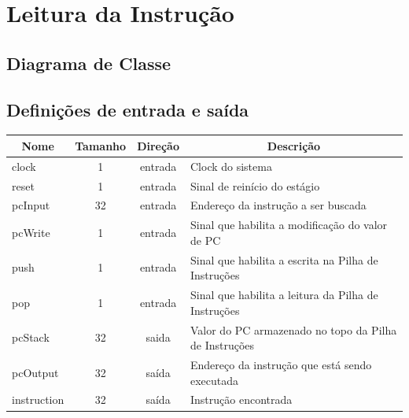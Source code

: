 \section{Leitura da Instrução}
	\subsection{Diagrama de Classe}
  \begin{figure}[h!]
    
  \end{figure}
		
		\subsection{Definições de entrada e saída}
		
	\begin{center}
		\begin{longtable}[pos]{| l | c | c | m{7cm} |} \hline
			\multicolumn{1}{|c|}{\cellcolor[gray]{0.9}\textbf{Nome}} & 
			\multicolumn{1}{c|}{\cellcolor[gray]{0.9}\textbf{Tamanho}} & 
			\multicolumn{1}{c|}{\cellcolor[gray]{0.9}\textbf{Direção}} &
			\multicolumn{1}{c|}{\cellcolor[gray]{0.9}\textbf{Descrição}} \\ \hline
			\endhead
			\hline
			\endlastfoot
			clock & 1 & entrada & Clock do sistema \\ \hline
			reset & 1 & entrada & Sinal de reinício do estágio\\ \hline
			pcInput & 32 & entrada & Endereço da instrução a ser buscada \\ \hline
			pcWrite & 1 & entrada & Sinal que habilita a modificação do valor de PC \\ \hline
			push & 1 & entrada & Sinal que habilita a escrita na Pilha de Instruções\\ \hline
			pop & 1 & entrada & Sinal que habilita a leitura da Pilha de Instruções\\ \hline
			pcStack & 32 & saida & Valor do PC armazenado no topo da Pilha de Instruções\\ \hline
			pcOutput & 32 & saída & Endereço da instrução que está sendo executada \\ \hline
			instruction & 32 & saída & Instrução encontrada \\ \hline
			
		\end{longtable}
	\end{center}
	
	
